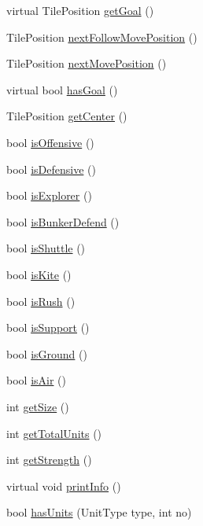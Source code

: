 \begin{DoxyCompactItemize}
\item 
virtual Tile\-Position \hyperlink{class_squad_ae9278dcf91e317c4316ce19e4c7c3b9e}{get\-Goal} ()
\item 
Tile\-Position \hyperlink{class_squad_a2295fb723176ad50ca7b56b5117c348f}{next\-Follow\-Move\-Position} ()
\item 
Tile\-Position \hyperlink{class_squad_a9acb3a00ec6d40b5bf01f1bc7e377661}{next\-Move\-Position} ()
\item 
virtual bool \hyperlink{class_squad_a5ad7231b7644be74b42318ff97d6f5e3}{has\-Goal} ()
\item 
Tile\-Position \hyperlink{class_squad_a89c5a600f312920314ef0f30dc1e582b}{get\-Center} ()
\item 
bool \hyperlink{class_squad_af9d5a2b70babb50dbbe3ae0d3645a871}{is\-Offensive} ()
\item 
bool \hyperlink{class_squad_a16a7474f9227ffe52999681032faa2b5}{is\-Defensive} ()
\item 
bool \hyperlink{class_squad_af8c45064b410c6902f614d3fea381d24}{is\-Explorer} ()
\item 
bool \hyperlink{class_squad_a128b16fd4757537a296f6f21519af7cd}{is\-Bunker\-Defend} ()
\item 
bool \hyperlink{class_squad_a879c20e23f8089678e4b49943e4b2bdc}{is\-Shuttle} ()
\item 
bool \hyperlink{class_squad_aeddc272cbe51f123f90caa278e359055}{is\-Kite} ()
\item 
bool \hyperlink{class_squad_ac50b13fa28d74e46f8c0ca467eaea423}{is\-Rush} ()
\item 
bool \hyperlink{class_squad_a2d027738d083b50abeb077cf8658ff78}{is\-Support} ()
\item 
bool \hyperlink{class_squad_aef91fd8a4d905615c3c15248e64d8607}{is\-Ground} ()
\item 
bool \hyperlink{class_squad_a6ad1be5c9231c15652ae347a34c465dd}{is\-Air} ()
\item 
int \hyperlink{class_squad_aa65e364147adb15d93f82ce57f9b6fa8}{get\-Size} ()
\item 
int \hyperlink{class_squad_a1bfdf801793c5e843ff1a9adfba61b3a}{get\-Total\-Units} ()
\item 
int \hyperlink{class_squad_a6b590cfa00087f286192ff655530e2d3}{get\-Strength} ()
\item 
virtual void \hyperlink{class_squad_a02e1bb7b5d5579df71cc94ce372ae13c}{print\-Info} ()
\item 
bool \hyperlink{class_squad_a4235306fd34de49f920af0f5f7d6df00}{has\-Units} (Unit\-Type type, int no)
\end{DoxyCompactItemize}
